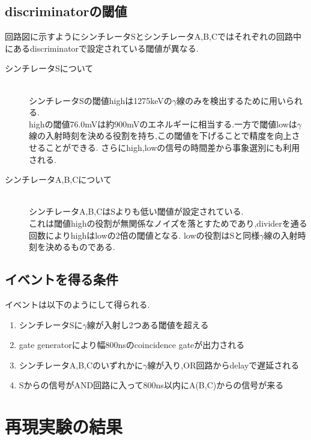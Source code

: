 \subsection{discriminatorの閾値}
回路図に示すようにシンチレータSとシンチレータA,B,Cではそれぞれの回路中にあるdiscriminatorで設定されている閾値が異なる.
\begin{description}
	\item[シンチレータSについて]\mbox{}\\
		シンチレータSの閾値highは1275keVの$\gamma$線のみを検出するために用いられる.\\
		highの閾値76.0mVは約900mVのエネルギーに相当する.一方で閾値lowは$\gamma$線の入射時刻を決める役割を持ち,この閾値を下げることで精度を向上させることができる.
		さらにhigh,lowの信号の時間差から事象選別にも利用される.
	\item[シンチレータA,B,Cについて]\mbox{}\\
		シンチレータA,B,CはSよりも低い閾値が設定されている.\\
		これは閾値highの役割が無関係なノイズを落とすためであり,dividerを通る回数によりhighはlowの2倍の閾値となる.
		lowの役割はSと同様$\gamma$線の入射時刻を決めるものである.
\end{description}

\subsection{イベントを得る条件}
イベントは以下のようにして得られる.
\begin{enumerate}
	\item シンチレータSに$\gamma$線が入射し2つある閾値を超える
	\item gate generatorにより幅800nsのcoincidence gateが出力される
	\item シンチレータA,B,Cのいずれかに$\gamma$線が入り,OR回路からdelayで遅延される
	\item Sからの信号がAND回路に入って800ns以内にA(B,C)からの信号が来る
\end{enumerate}

\section{再現実験の結果}

